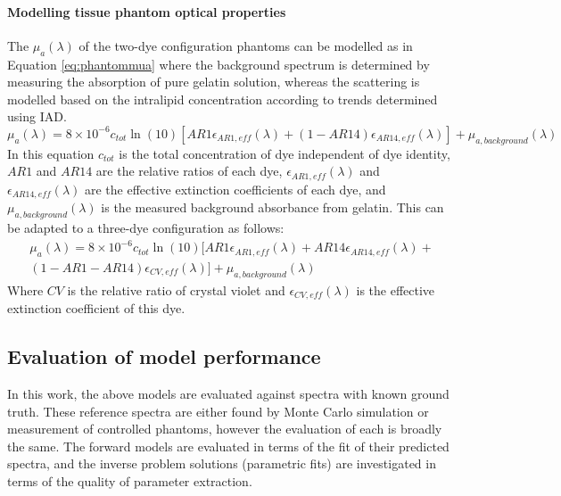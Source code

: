 \paragraph{Modelling tissue phantom optical properties}\label{sec:methodphantommodel}
The $\mu_a(\lambda)$ of the two-dye configuration phantoms can be modelled as in Equation \eqref{eq:phantommua} where the background spectrum is determined by measuring the absorption of pure gelatin solution, whereas the scattering is modelled based on the intralipid concentration according to trends determined using IAD. 
\begin{equation}
    \mu_{a}(\lambda) = 8\times10^{-6}c_{tot}\ln(10)[AR1 \epsilon_{AR1, eff}(\lambda) + (1 - AR14)\epsilon_{AR14, eff}(\lambda)] + \mu_{a, background}(\lambda)
    \label{eq:phantommua}
\end{equation}
In this equation $c_{tot}$ is the total concentration of dye independent of dye identity, $AR1$ and $AR14$ are the relative ratios of each dye, $\epsilon_{AR1, eff}(\lambda)$ and $\epsilon_{AR14, eff}(\lambda)$ are the effective extinction coefficients of each dye, and  $\mu_{a, background}(\lambda)$ is the measured background absorbance from gelatin. This can be adapted to a three-dye configuration as follows: 
\begin{multline}
    \mu_{a}(\lambda) = 8\times10^{-6}c_{tot}\ln(10)[AR1 \epsilon_{AR1, eff}(\lambda) + AR14\epsilon_{AR14, eff}(\lambda) + \\
    (1 - AR1 - AR14)\epsilon_{CV, eff}(\lambda)] + \mu_{a, background}(\lambda)
    \label{eq:phantommua3}
\end{multline}
Where $CV$ is the relative ratio of crystal violet and $\epsilon_{CV, eff}(\lambda)$ is the effective extinction coefficient of this dye.

\subsection{Evaluation of model performance}\label{sec:methodevaluate}
In this work, the above models are evaluated against spectra with known ground truth. These reference spectra are either found by Monte Carlo simulation or measurement of controlled phantoms, however the evaluation of each is broadly the same. The forward models are evaluated in terms of the fit of their predicted spectra, and the inverse problem solutions (parametric fits) are investigated in terms of the quality of parameter extraction. 

